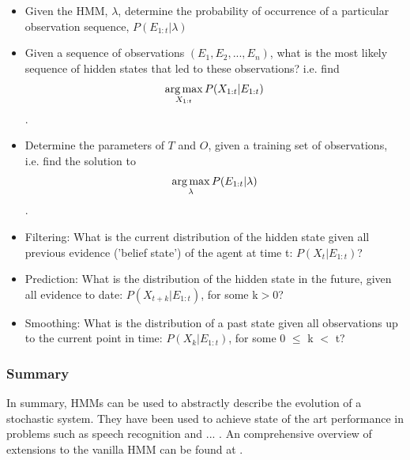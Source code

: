 \begin{itemize}
    \item Given the HMM, $\lambda$, determine the probability of occurrence of a particular observation sequence, $P(E_{1:t} | \lambda)$
    \item Given a sequence of observations $(E_1, E_2, ..., E_n)$, what is the most likely sequence of hidden states that led to these observations? i.e. find \[\operatorname*{arg\,max}_{X_{1:t}} P(X_{1:t} | E_{1:t})\].
    \item Determine the parameters of $T$ and $O$, given a training set of observations, i.e. find the solution to \[\operatorname*{arg\,max}_{\lambda} P(E_{1:t} | \lambda)\].
    \item Filtering: What is the current distribution of the hidden state given all previous evidence ('belief state') of the agent at time t: $P(X_t | E_{1:t})$?
    \item Prediction: What is the distribution of the hidden state in the future, given all evidence to date: $P(X_{t+k} | E_{1:t})$, for some k$>$0?
    \item Smoothing: What is the distribution of a past state given all observations up to the current point in time: $P(X_k | E_{1:t})$, for some 0 $\leq$ k $<$ t?
\end{itemize}
\par


\subsubsection{Summary}
In summary, HMMs can be used to abstractly describe the evolution of a stochastic system. They have been used to achieve state of the art performance in problems such as speech recognition \cite{ChiuSTATE-OF-THE-ARTMODELS} and ... . An comprehensive overview of extensions to the vanilla HMM can be found at \cite{Murphy1994DynamicLearning}.
